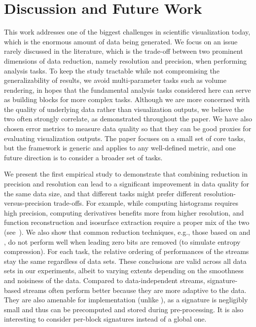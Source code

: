 \section{Discussion and Future Work}

{\color{blue}This work addresses one of the biggest challenges in scientific visualization today,
which is the enormous amount of data being generated. We focus on an issue rarely discussed in the
literature, which is the trade-off between two prominent dimensions of data reduction, namely
resolution and precision, when performing analysis tasks. To keep the study tractable while not
compromising the generalizability of results, we avoid multi-parameter tasks such as volume
rendering, in hopes that the fundamental analysis tasks considered here can serve as building blocks
for more complex tasks. Although we are more concerned with the quality of underlying data rather
than visualization outputs, we believe the two often strongly correlate, as demonstrated throughout
the paper. We have also chosen error metrics to measure data quality so that they can be good
proxies for evaluating visualization outputs. The paper focuses on a small set of core tasks, but
the framework is generic and applies to any well-defined metric, and one future direction is to
consider a broader set of tasks.}

We present the first empirical study to demonstrate that combining reduction in precision and
resolution can lead to a significant improvement in data quality for the same data size, and that
different tasks might prefer different resolution-versus-precision trade-offs. For example, while
computing histograms requires high precision, computing derivatives benefits more from higher
resolution, and function reconstruction and isosurface extraction require a proper mix of the two
(see~). We also show that common reduction techniques, e.g., those based on
\slvl and \smag, do not perform well when leading zero bits are removed (to simulate entropy
compression). {\color{red}For each task, the relative ordering of performances of the streams stay
the same regardless of data sets. These conclusions are valid across all data sets in our
experiments, albeit to varying extents depending on the smoothness and noisiness of the data.
Compared to data-independent streams, signature-based streams often perform better because they are
more adaptive to the data. They are also amenable for implementation (unlike \sopt), as a signature
is negligibly small and thus can be precomputed and stored during pre-processing. It is also
interesting to consider per-block signatures instead of a global one.}

